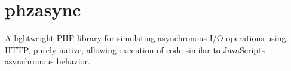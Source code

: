 \chapter{phzasync}
\hypertarget{md__c_1_2xampp_2htdocs_2async_2phzasync_2_r_e_a_d_m_e}{}\label{md__c_1_2xampp_2htdocs_2async_2phzasync_2_r_e_a_d_m_e}
\label{md__c_1_2xampp_2htdocs_2async_2phzasync_2_r_e_a_d_m_e_autotoc_md0}%
%
A lightweight PHP library for simulating asynchronous I/O operations using HTTP, purely native, allowing execution of code similar to Java\+Script\textquotesingle{}s asynchronous behavior. 